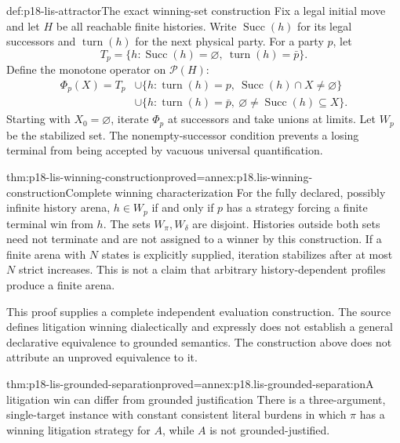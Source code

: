 \begin{hbdefinition}{def:p18-lis-attractor}{The exact winning-set construction}
Fix a legal initial move and let \(H\) be all reachable finite
histories. Write \(\operatorname{Succ}(h)\) for its legal successors
and \(\operatorname{turn}(h)\) for the next physical party.
For a party \(p\), let
\[
T_p=\{h:\operatorname{Succ}(h)=\varnothing,\
                   \operatorname{turn}(h)=\bar p\}.
\]
Define the monotone operator on \(\mathcal P(H)\):
\[
\begin{split}
\Phi_p(X)=T_p
&\cup\{h:\operatorname{turn}(h)=p,\
                 \operatorname{Succ}(h)\cap X\ne\varnothing\}\\
&\cup\{h:\operatorname{turn}(h)=\bar p,\
     \varnothing\ne\operatorname{Succ}(h)\subseteq X\}.
\end{split}
\]
Starting with \(X_0=\varnothing\), iterate \(\Phi_p\) at successors
and take unions at limits. Let \(W_p\) be the stabilized set.
The nonempty-successor condition prevents a losing terminal from
being accepted by vacuous universal quantification.
\end{hbdefinition}

\begin{hbtheorem}{thm:p18-lis-winning-construction}{proved=annex:p18.lis-winning-construction}{Complete winning characterization}
For the fully declared, possibly infinite history arena, \(h\in W_p\)
if and only if \(p\) has a strategy forcing a finite terminal win
from \(h\). The sets \(W_\pi,W_\delta\) are disjoint.
Histories outside both sets need not terminate and are not assigned
to a winner by this construction.
If a finite arena with \(N\) states is explicitly supplied, iteration
stabilizes after at most \(N\) strict increases.
This is not a claim that arbitrary history-dependent profiles produce
a finite arena.
\end{hbtheorem}

This proof supplies a complete independent evaluation construction.
The source defines litigation winning dialectically and expressly
does not establish a general declarative equivalence to grounded
semantics. The construction above does not attribute an unproved
equivalence to it.

\begin{hbtheorem}{thm:p18-lis-grounded-separation}{proved=annex:p18.lis-grounded-separation}{A litigation win can differ from grounded justification}
There is a three-argument, single-target instance with constant
consistent literal burdens in which \(\pi\) has a winning litigation
strategy for \(A\), while \(A\) is not grounded-justified.
\end{hbtheorem}

